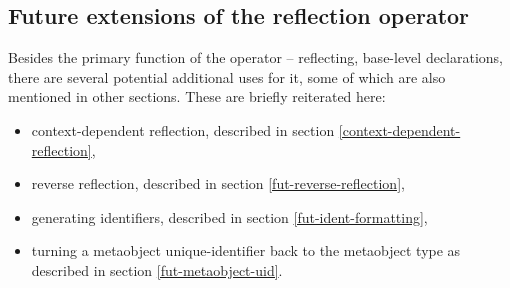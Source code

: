 \subsection{Future extensions of the reflection operator}
\label{fut-reflexpr}

Besides the primary function of the \verb@reflexpr@ operator -- reflecting,
base-level declarations, there are several potential additional uses for it,
some of which are also mentioned in other sections. These are briefly reiterated
here:

\begin{itemize}
\item context-dependent reflection, described in section
	\ref{context-dependent-reflection},
\item reverse reflection, described in section \ref{fut-reverse-reflection},
\item generating identifiers, described in section \ref{fut-ident-formatting},
\item turning a \verb@constexpr@ metaobject unique-identifier back
	to the metaobject type as described in section \ref{fut-metaobject-uid}.
\end{itemize}

